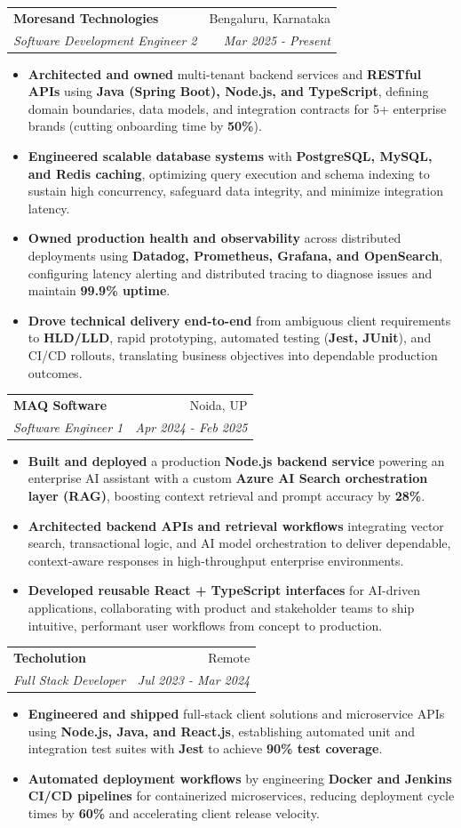 \documentclass[a4paper,10pt]{article}
\makeatletter
\newcommand{\resumeSubheading}[4]{
  \vspace{-1pt}\item
    \begin{tabular*}{0.97\textwidth}{l@{\extracolsep{\fill}}r}
      \textbf{#1} & #2 \\
      \textit{#3} & \textit{#4} \\
    \end{tabular*}\vspace{-5pt}
}
\newcommand{\resumeItemListStart}{\begin{itemize}}
\newcommand{\resumeItemListEnd}{\end{itemize}\vspace{-5pt}}
\makeatother
\begin{document}
    \resumeSubheading{Moresand Technologies}{Bengaluru, Karnataka}
      {Software Development Engineer 2}{Mar 2025 - Present}
      \resumeItemListStart
        \item \textnormal{\textbf{Architected and owned} multi-tenant backend services and \textbf{RESTful APIs} using \textbf{Java (Spring Boot), Node.js, and TypeScript}, defining domain boundaries, data models, and integration contracts for 5+ enterprise brands (cutting onboarding time by \textbf{50\%}).}
        \item \textnormal{\textbf{Engineered scalable database systems} with \textbf{PostgreSQL, MySQL, and Redis caching}, optimizing query execution and schema indexing to sustain high concurrency, safeguard data integrity, and minimize integration latency.}
        \item \textnormal{\textbf{Owned production health and observability} across distributed deployments using \textbf{Datadog, Prometheus, Grafana, and OpenSearch}, configuring latency alerting and distributed tracing to diagnose issues and maintain \textbf{99.9\% uptime}.}
        \item \textnormal{\textbf{Drove technical delivery end-to-end} from ambiguous client requirements to \textbf{HLD/LLD}, rapid prototyping, automated testing (\textbf{Jest, JUnit}), and CI/CD rollouts, translating business objectives into dependable production outcomes.}
      \resumeItemListEnd

    \resumeSubheading{MAQ Software}{Noida, UP}
      {Software Engineer 1}{Apr 2024 - Feb 2025}
      \resumeItemListStart
        \item \textnormal{\textbf{Built and deployed} a production \textbf{Node.js backend service} powering an enterprise AI assistant with a custom \textbf{Azure AI Search orchestration layer (RAG)}, boosting context retrieval and prompt accuracy by \textbf{28\%}.}
        \item \textnormal{\textbf{Architected backend APIs and retrieval workflows} integrating vector search, transactional logic, and AI model orchestration to deliver dependable, context-aware responses in high-throughput enterprise environments.}
        \item \textnormal{\textbf{Developed reusable React + TypeScript interfaces} for AI-driven applications, collaborating with product and stakeholder teams to ship intuitive, performant user workflows from concept to production.}
      \resumeItemListEnd

    \resumeSubheading{Techolution}{Remote}
      {Full Stack Developer}{Jul 2023 - Mar 2024}
      \resumeItemListStart
        \item \textnormal{\textbf{Engineered and shipped} full-stack client solutions and microservice APIs using \textbf{Node.js, Java, and React.js}, establishing automated unit and integration test suites with \textbf{Jest} to achieve \textbf{90\% test coverage}.}
        \item \textnormal{\textbf{Automated deployment workflows} by engineering \textbf{Docker and Jenkins CI/CD pipelines} for containerized microservices, reducing deployment cycle times by \textbf{60\%} and accelerating client release velocity.}
      \resumeItemListEnd
\end{document}
